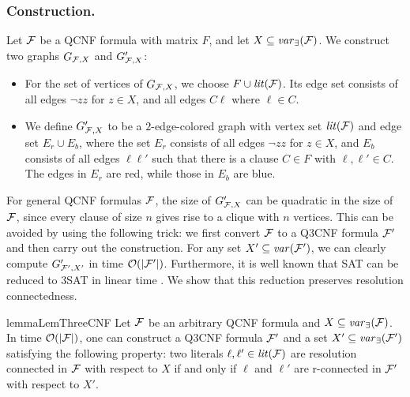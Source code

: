 \documentclass{llncs}
\newcommand{\shortversion}[1]{}
\def\hy{\hbox{-}\nobreak\hskip0pt} \newcommand{\ellipsis}{$\dots$}
\newcommand{\Card}[1]{|#1|}
\begin{document}
\subsubsection{Construction.}  Let $\mathcal{F}$ be a QCNF formula with matrix
$F$, and let $X \subseteq \mathit{var}_{\exists}(\mathcal{F})$. We construct two graphs
$G_{\mathcal{F},X}$ and $G'_{\mathcal{F},X}$:
\begin{itemize}
\item For the set of vertices of $G_{\mathcal{F},X}$, we choose $F \cup
  \mathit{lit}(\mathcal{F})$. Its edge set consists of all edges $\neg zz$ for $z \in X$, and
  all edges $C\ell$ where $\ell \in C$.

\item We define $G'_{\mathcal{F},X}$ to be a $2$\hy edge\hy colored graph with vertex
  set $\mathit{lit}(\mathcal{F})$ and edge set $E_r \cup E_b$, where the set $E_r$ consists
  of all edges $\neg zz$ for $z \in X$, and $E_b$ consists of all edges
  $\ell\ell'$ such that there is a clause $C \in F$ with $\ell, \ell' \in
  C$. The edges in $E_r$ are red, while those in $E_b$ are
  blue. \end{itemize}
For general QCNF formulas $\mathcal{F}$, the size of $G'_{\mathcal{F},X}$ can be quadratic
in the size of $\mathcal{F}$, since every clause of size $n$ gives rise to a clique
with $n$ vertices. This can be avoided by using the following trick: we first
convert $\mathcal{F}$ to a Q3CNF formula $\mathcal{F}'$ and then carry out the
construction. For any set $X' \subseteq \mathit{var}(\mathcal{F}')$, we can clearly compute
$G'_{\mathcal{F}',X'}$ in time $\mathcal{O}(\Card{\FFF'})$. Furthermore, it is well
known that SAT can be reduced to 3SAT in linear time
\cite{KleineBuningLettman99}. We show that this reduction preserves resolution
connectedness.
\begin{restatable}{lemma}{LemThreeCNF}\label{lem:3cnf}\shortversion{\textup{($\star$)}}
  Let $\mathcal{F}$ be an arbitrary QCNF formula and $X \subseteq
  \mathit{var}_{\exists}(\mathcal{F})$. In time $\mathcal{O}(\Card{\FFF})$, one can construct
  a Q3CNF formula $\mathcal{F}'$ and a set $X' \subseteq \mathit{var}_{\exists}(\mathcal{F}')$
  satisfying the following property: two literals $\ell, \ell' \in \mathit{lit}(\mathcal{F})$
  are resolution connected in $\mathcal{F}$ with respect to $X$ if and only if $\ell$
  and $\ell'$ are r\hy connected in $\mathcal{F}'$ with respect to $X'$.
\end{restatable}
\end{document}
